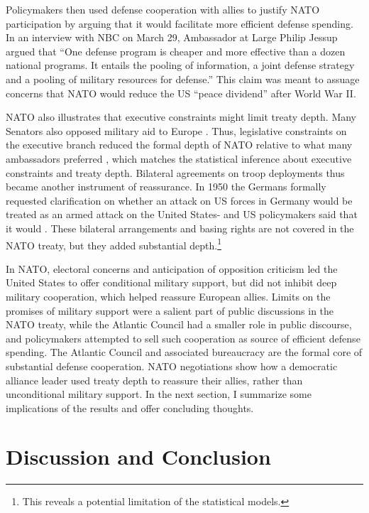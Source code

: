 \documentclass[12pt]{article}
\begin{document}
Policymakers then used defense cooperation with allies to justify NATO participation by arguing that it would facilitate more efficient defense spending. 
In an interview with NBC on March 29, Ambassador at Large Philip Jessup argued that ``One defense program is cheaper and more effective than a dozen national programs. It entails the pooling of information, a joint defense strategy and a pooling of military resources for defense.''
This claim was meant to assuage concerns that NATO would reduce the US ``peace dividend'' after World War II. 


NATO also illustrates that executive constraints might limit treaty depth. 
Many Senators also opposed military aid to Europe \citep[pg 285]{Acheson1969}. 
Thus, legislative constraints on the executive branch reduced the formal depth of NATO relative to what many ambassadors preferred \citep[pg 277]{Acheson1969}, which matches the statistical inference about executive constraints and treaty depth.  
Bilateral agreements on troop deployments thus became another instrument of reassurance. 
In 1950 the Germans formally requested clarification on whether an attack on US forces in Germany would be treated as an armed attack on the United States- and US policymakers said that it would \citep[pg. 395]{Acheson1969}.  
These bilateral arrangements and basing rights are not covered in the NATO treaty, but they added substantial depth.\footnote{This reveals a potential limitation of the statistical models.}  


In NATO, electoral concerns and anticipation of opposition criticism led the United States to offer conditional military support, but did not inhibit deep military cooperation, which helped reassure European allies. 
Limits on the promises of military support were a salient part of public discussions in the NATO treaty, while the Atlantic Council had a smaller role in public discourse, and policymakers attempted to sell such cooperation as source of efficient defense spending. 
The Atlantic Council and associated bureaucracy are the formal core of substantial defense cooperation. 
NATO negotiations show how a democratic alliance leader used treaty depth to reassure their allies, rather than unconditional military support. 
In the next section, I summarize some implications of the results and offer concluding thoughts. 



\section{Discussion and Conclusion} 
\end{document}
